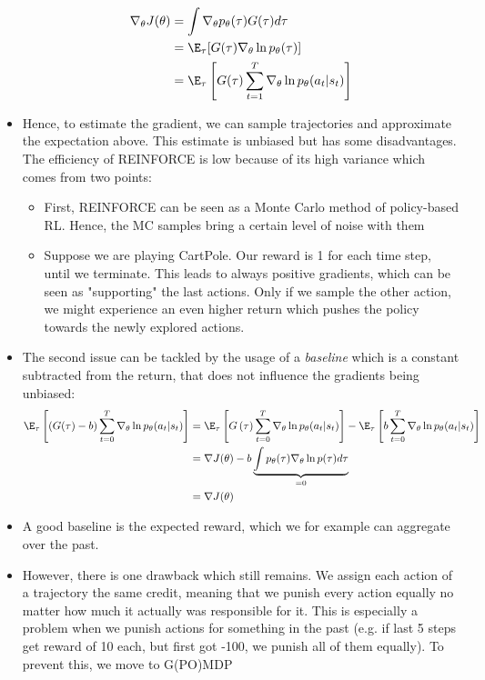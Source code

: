 \begin{itemize}
	\begin{equation*}
		\begin{split}
			\nabla_{\theta}J(\theta) & = \int \nabla_{\theta} p_{\theta}(\tau) G(\tau)d\tau\\
			& = \E_{\tau}[G(\tau)\nabla_{\theta} \ln p_{\theta}(\tau)]\\
			& = \E_{\tau}\left[G(\tau)\sum_{t=1}^{T}\nabla_{\theta} \ln p_{\theta}(a_t|s_t)\right]\\
		\end{split}
	\end{equation*}
	\item Hence, to estimate the gradient, we can sample trajectories and approximate the expectation above. This estimate is unbiased but has some disadvantages. The efficiency of REINFORCE is low because of its high variance which comes from two points:
	\begin{itemize}
		\item First, REINFORCE can be seen as a Monte Carlo method of policy-based RL. Hence, the MC samples bring a certain level of noise with them
		\item Suppose we are playing CartPole. Our reward is 1 for each time step, until we terminate. This leads to always positive gradients, which can be seen as "supporting" the last actions. Only if we sample the other action, we might experience an even higher return which pushes the policy towards the newly explored actions. 
	\end{itemize}
	\item The second issue can be tackled by the usage of a \textit{baseline} which is a constant subtracted from the return, that does not influence the gradients being unbiased:
	\begin{equation*}
		\begin{split}
			\E_{\tau}\left[\left(G(\tau)-b\right)\sum_{t=0}^{T}\nabla_{\theta} \ln p_{\theta}(a_t|s_t)\right] & = \E_{\tau}\left[G\left(\tau\right)\sum_{t=0}^{T}\nabla_{\theta} \ln p_{\theta}(a_t|s_t)\right]  - \E_{\tau}\left[b\sum_{t=0}^{T}\nabla_{\theta} \ln p_{\theta}(a_t|s_t)\right] \\
			& = \nabla J(\theta) - b\underbrace{\int p_{\theta}(\tau)\nabla_{\theta} \ln p(\tau)d\tau}_{=0}\\
			& = \nabla J(\theta) 
		\end{split}
	\end{equation*}
	\item A good baseline is the expected reward, which we for example can aggregate over the past.
	\item However, there is one drawback which still remains. We assign each action of a trajectory the same credit, meaning that we punish every action equally no matter how much it actually was responsible for it. This is especially a problem when we punish actions for something in the past (e.g. if last 5 steps get reward of 10 each, but first got -100, we punish all of them equally). To prevent this, we move to G(PO)MDP
\end{itemize}
